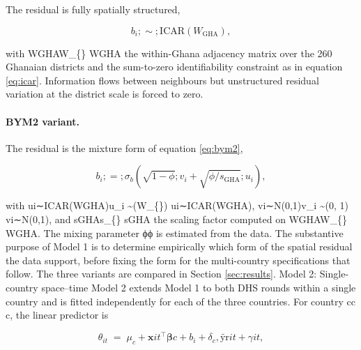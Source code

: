 \documentclass{article}
\begin{document}
The residual is fully spatially structured,

\begin{equation}

b_i ;\sim; \mathrm{ICAR}(W_{\text{GHA}}),

\label{eq:m1-icar}

\end{equation}

with WGHAW\_\{\} WGHA\hspace{0pt} the within-Ghana adjacency
matrix over the 260 Ghanaian districts and the sum-to-zero
identifiability constraint as in equation \ref{eq:icar}. Information
flows between neighbours but unstructured residual variation at the
district scale is forced to zero.

\paragraph{BYM2 variant.}

The residual is the mixture form of equation \ref{eq:bym2},

\begin{equation}

b_i ;=; \sigma_b \left( \sqrt{1 - \phi} ; v_i + \sqrt{\phi / s_{\text{GHA}}} ; u_i \right),

\label{eq:m1-bym2}

\end{equation}

with ui∼ICAR(WGHA)u\_i \sim {}(W\_\{\})
ui\hspace{0pt}∼ICAR(WGHA\hspace{0pt}), vi∼N(0,1)v\_i \sim {}(0,
1) vi\hspace{0pt}∼N(0,1), and sGHAs\_\{\} sGHA\hspace{0pt} the
scaling factor computed on WGHAW\_\{\} WGHA\hspace{0pt}. The
mixing parameter ϕ\phi ϕ is estimated from the data. The substantive
purpose of Model 1 is to determine empirically which form of the spatial
residual the data support, before fixing the form for the multi-country
specifications that follow. The three variants are compared in Section
\ref{sec:results}. Model 2: Single-country space--time \label{sec:m2}
Model 2 extends Model 1 to both DHS rounds within a single country and
is fitted independently for each of the three countries. For country cc
c, the linear predictor is

\begin{equation}

\theta_{it} \;=\; \mu_c + \mathbf{x}{it}^{\top} \bm{\beta}c + b_i + \delta_c , \widetilde{\text{yr}}{it} + \gamma{it},

\label{eq:m2}

\end{equation}
\end{document}
